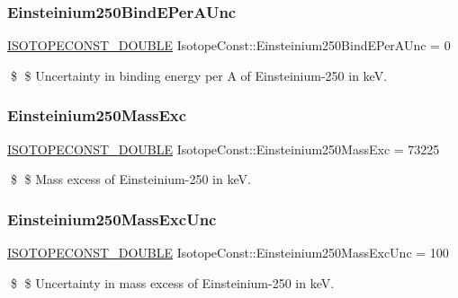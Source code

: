 \subsubsection{\texorpdfstring{Einsteinium250\+Bind\+E\+Per\+A\+Unc}{Einsteinium250BindEPerAUnc}}
{\footnotesize\ttfamily \mbox{\hyperlink{group___isotope_const-_macros_ga8f45a7272ce02c0b4c65c44636ed719a}{I\+S\+O\+T\+O\+P\+E\+C\+O\+N\+S\+T\+\_\+\+D\+O\+U\+B\+LE}} Isotope\+Const\+::\+Einsteinium250\+Bind\+E\+Per\+A\+Unc = 0}

\$ \$ Uncertainty in binding energy per A of Einsteinium-\/250 in keV. \mbox{\label{group___isotope_const-_einsteinium-_es250_ga86176129efcabeab11da55f3254807a8}} 
\subsubsection{\texorpdfstring{Einsteinium250\+Mass\+Exc}{Einsteinium250MassExc}}
{\footnotesize\ttfamily \mbox{\hyperlink{group___isotope_const-_macros_ga8f45a7272ce02c0b4c65c44636ed719a}{I\+S\+O\+T\+O\+P\+E\+C\+O\+N\+S\+T\+\_\+\+D\+O\+U\+B\+LE}} Isotope\+Const\+::\+Einsteinium250\+Mass\+Exc = 73225}

\$ \$ Mass excess of Einsteinium-\/250 in keV. \mbox{\label{group___isotope_const-_einsteinium-_es250_ga168d0659323287246d5b5eeb1832516b}} 
\subsubsection{\texorpdfstring{Einsteinium250\+Mass\+Exc\+Unc}{Einsteinium250MassExcUnc}}
{\footnotesize\ttfamily \mbox{\hyperlink{group___isotope_const-_macros_ga8f45a7272ce02c0b4c65c44636ed719a}{I\+S\+O\+T\+O\+P\+E\+C\+O\+N\+S\+T\+\_\+\+D\+O\+U\+B\+LE}} Isotope\+Const\+::\+Einsteinium250\+Mass\+Exc\+Unc = 100}

\$ \$ Uncertainty in mass excess of Einsteinium-\/250 in keV. \mbox{\label{group___isotope_const-_einsteinium-_es250_ga4d4bc806f06901da5590238cf802968a}} 
